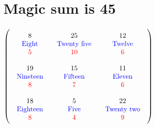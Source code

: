 \documentclass{article}
\begin{document}
\section{Magic sum is 45}$ \left( \begin{array}{ccc}
\begin{array}{c}
\rule{0pt}{1.5em}8 \\ 
\text{\color{blue}Eight} \\ 
\color{red}5 \vspace{.5em} 
\end{array} & \begin{array}{c}
\rule{0pt}{1.5em}25 \\ 
\text{\color{blue}Twenty five} \\ 
\color{red}10 \vspace{.5em} 
\end{array} & \begin{array}{c}
\rule{0pt}{1.5em}12 \\ 
\text{\color{blue}Twelve} \\ 
\color{red}6 \vspace{.5em} 
\end{array}\\ 
\begin{array}{c}
\rule{0pt}{1.5em}19 \\ 
\text{\color{blue}Nineteen} \\ 
\color{red}8 \vspace{.5em} 
\end{array} & \begin{array}{c}
\rule{0pt}{1.5em}15 \\ 
\text{\color{blue}Fifteen} \\ 
\color{red}7 \vspace{.5em} 
\end{array} & \begin{array}{c}
\rule{0pt}{1.5em}11 \\ 
\text{\color{blue}Eleven} \\ 
\color{red}6 \vspace{.5em} 
\end{array}\\ 
\begin{array}{c}
\rule{0pt}{1.5em}18 \\ 
\text{\color{blue}Eighteen} \\ 
\color{red}8 \vspace{.5em} 
\end{array} & \begin{array}{c}
\rule{0pt}{1.5em}5 \\ 
\text{\color{blue}Five} \\ 
\color{red}4 \vspace{.5em} 
\end{array} & \begin{array}{c}
\rule{0pt}{1.5em}22 \\ 
\text{\color{blue}Twenty two} \\ 
\color{red}9 \vspace{.5em} 
\end{array}\end{array} \right) $
\end{document}
